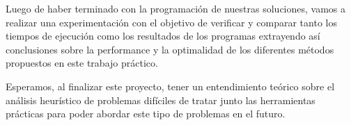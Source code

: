 \par{Luego de haber terminado con la programación de nuestras soluciones,
vamos a realizar una experimentación con el objetivo de verificar y comparar
tanto los tiempos de ejecución como los resultados de los programas extrayendo
así conclusiones sobre la performance y la optimalidad de los diferentes
métodos propuestos en este trabajo práctico.}\\

\par{Esperamos, al finalizar este proyecto, tener un entendimiento teórico
sobre el análisis heurístico de problemas difíciles de tratar junto las
herramientas prácticas para poder abordar este tipo de problemas en el futuro.}
